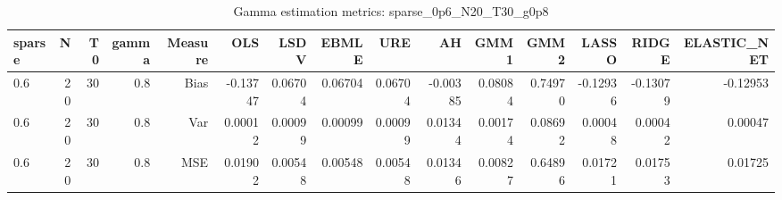 \begin{table}[!htbp]\centering
\caption{Gamma estimation metrics: sparse_0p6_N20_T30_g0p8}
\label{tab:table1_sparse_0p6_N20_T30_g0p8}
\begin{tabular}{lrrrrrrrrrrrrrr}
\hline
sparse & N & T0 & gamma & Measure & OLS & LSDV & EBMLE & URE & AH & GMM1 & GMM2 & LASSO & RIDGE & ELASTIC_NET \\
\hline
0.6 & 20 & 30 & 0.8 & Bias & -0.13747 & 0.06704 & 0.06704 & 0.06704 & -0.00385 & 0.08084 & 0.74970 & -0.12936 & -0.13079 & -0.12953 \\
0.6 & 20 & 30 & 0.8 & Var & 0.00012 & 0.00099 & 0.00099 & 0.00099 & 0.01344 & 0.00174 & 0.08692 & 0.00048 & 0.00042 & 0.00047 \\
0.6 & 20 & 30 & 0.8 & MSE & 0.01902 & 0.00548 & 0.00548 & 0.00548 & 0.01346 & 0.00827 & 0.64896 & 0.01721 & 0.01753 & 0.01725 \\
\hline
\end{tabular}
\end{table}

